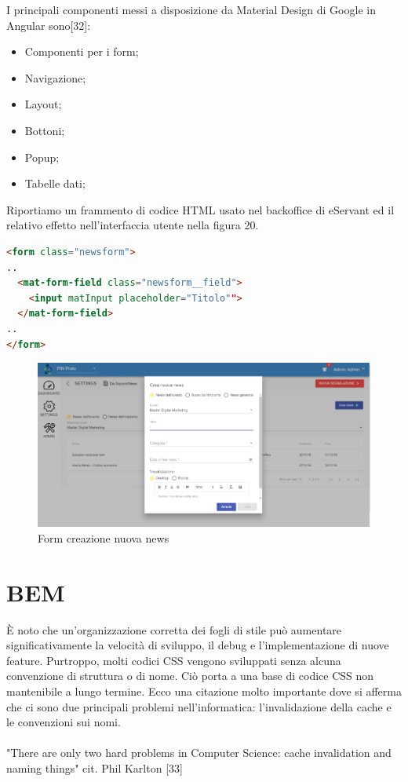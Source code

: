 I principali componenti messi a disposizione da Material Design di Google in Angular sono[32]:

\begin{itemize}
    \item Componenti per i form;
    \item Navigazione;
    \item Layout;
    \item Bottoni;
    \item Popup;
    \item Tabelle dati;
\end{itemize}

Riportiamo un frammento di codice HTML usato nel backoffice di eServant ed il relativo effetto
nell'interfaccia utente nella figura 20.

\begin{lstlisting}[language=html]
<form class="newsform">
..
  <mat-form-field class="newsform__field">
    <input matInput placeholder="Titolo"">
  </mat-form-field>
..
</form>
\end{lstlisting}

\begin{figure}[H]
    \centering  
    \caption{Form creazione nuova news}
    \includegraphics[scale=0.4]{img/cap3/backoffice-form}
\end{figure}

\section{BEM}
È noto che un'organizzazione corretta dei fogli di stile può aumentare significativamente la velocità
di sviluppo, il debug e l'implementazione di nuove feature. Purtroppo, molti codici CSS vengono
sviluppati senza alcuna convenzione di struttura o di nome. Ciò porta a una base di codice CSS 
non mantenibile a lungo termine.
Ecco una citazione molto importante dove si afferma che ci sono due principali problemi nell'informatica: l'invalidazione della cache e le convenzioni sui nomi.\\\\
"There are only two hard problems in Computer Science: cache invalidation and naming things" cit. Phil Karlton [33]\\

